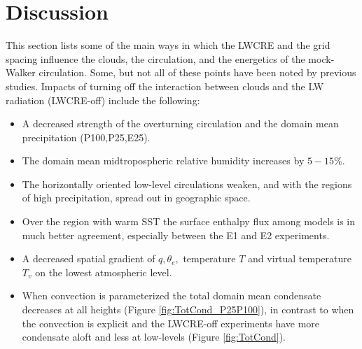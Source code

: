 \documentclass[draft]{agujournal2019}
\begin{document}
{%

\section{Discussion} %

This section lists some of the main ways in which the LWCRE and the grid spacing influence
the clouds, the circulation, and the energetics of the mock-Walker circulation.   Some, but not all of these 
points have been noted by previous studies.  
Impacts of turning off the interaction between clouds and the LW radiation (LWCRE-off) include the following: 

\begin{itemize}
  \item A decreased strength of the overturning circulation and the domain mean precipitation (P100,P25,E25).
  \item The domain mean midtropospheric relative humidity increases by $5-15 \% $.
  \item The horizontally oriented low-level circulations weaken, and with the regions of high precipitation, spread out 
  in geographic space.  
  \item Over the region with warm SST the surface enthalpy flux among models is in much better agreement, 
  especially between the E1 and E2 experiments.
  \item A decreased spatial gradient of $q, \theta_e,$ temperature $T$ and virtual temperature $T_v$ on the lowest 
  atmospheric level.  
  \item When convection is parameterized the total domain mean condensate decreases at all heights (Figure \ref{fig:TotCond_P25P100}), in contrast to 
  when the convection is explicit and the LWCRE-off experiments have more condensate aloft and less at low-levels (Figure \ref{fig:TotCond}).    
\end{itemize}

}
\end{document}
